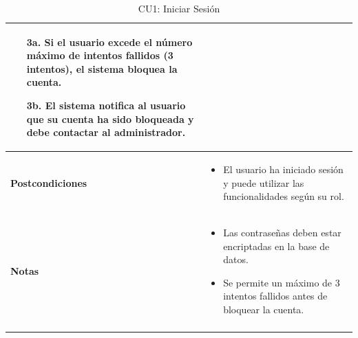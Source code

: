 \documentclass{article}
\begin{document}
\begin{longtable}{|l|p{10cm}|}
\begin{itemize}
    \begin{enumerate}
        \item[3a.] Si el usuario excede el número máximo de intentos fallidos (3 intentos), el sistema bloquea la cuenta.
        \item[3b.] El sistema notifica al usuario que su cuenta ha sido bloqueada y debe contactar al administrador.
    \end{enumerate}
\end{itemize} \\ \hline
\textbf{Postcondiciones} & 
\begin{itemize}
    \item El usuario ha iniciado sesión y puede utilizar las funcionalidades según su rol.
\end{itemize} \\ \hline
\textbf{Notas} & 
\begin{itemize}
    \item Las contraseñas deben estar encriptadas en la base de datos.
    \item Se permite un máximo de 3 intentos fallidos antes de bloquear la cuenta.
\end{itemize} \\ \hline
\caption{CU1: Iniciar Sesión} \\
\end{longtable}

\newpage
\end{document}
